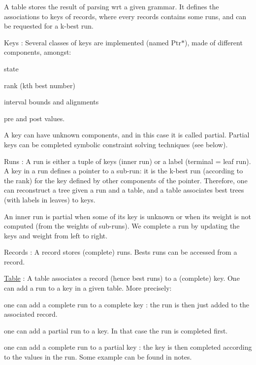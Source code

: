 A table stores the result of parsing wrt a given grammar. It defines the associations to {\ttfamily keys} of {\ttfamily records}, where every {\ttfamily records} contains some {\ttfamily runs}, and can be requested for a k-\/best {\ttfamily run}.

{\ttfamily Keys} \+: Several classes of {\ttfamily keys} are implemented (named {\ttfamily Ptr$\ast$}), made of different components, amongst\+:


\begin{DoxyItemize}
\item state
\item rank (kth best number)
\item interval bounds and alignments
\item pre and post values.
\end{DoxyItemize}

A {\ttfamily key} can have unknown components, and in this case it is called partial. Partial {\ttfamily keys} can be completed symbolic constraint solving techniques (see below).

{\ttfamily Runs} \+: A {\ttfamily run} is either a tuple of {\ttfamily keys} (inner {\ttfamily run}) or a {\ttfamily label} (terminal = leaf {\ttfamily run}). A {\ttfamily key} in a {\ttfamily run} defines a pointer to a sub-\/{\ttfamily run}\+: it is the k-\/best {\ttfamily run} (according to the rank) for the {\ttfamily key} defined by other components of the pointer. Therefore, one can reconstruct a tree given a {\ttfamily run} and a {\ttfamily table}, and a {\ttfamily table} associates best trees (with {\ttfamily labels} in leaves) to {\ttfamily keys}.

An inner {\ttfamily run} is partial when some of its {\ttfamily key} is unknown or when its weight is not computed (from the weights of sub-\/{\ttfamily runs}). We complete a {\ttfamily run} by updating the {\ttfamily keys} and weight from left to right.

{\ttfamily Records} \+: A {\ttfamily record} stores (complete) {\ttfamily runs}. Bests {\ttfamily runs} can be accessed from a record.

{\ttfamily \mbox{\hyperlink{classTable}{Table}}} \+: A {\ttfamily table} associates a {\ttfamily record} (hence best {\ttfamily runs}) to a (complete) {\ttfamily key}. One can add a {\ttfamily run} to a {\ttfamily key} in a given {\ttfamily table}. More precisely\+:


\begin{DoxyItemize}
\item one can add a complete {\ttfamily run} to a complete {\ttfamily key} \+: the {\ttfamily run} is then just added to the associated {\ttfamily record}.
\item one can add a partial {\ttfamily run} to a {\ttfamily key}. In that case the {\ttfamily run} is completed first.
\item one can add a complete {\ttfamily run} to a partial {\ttfamily key} \+: the {\ttfamily key} is then completed according to the values in the {\ttfamily run}. Some example can be found in notes. 
\end{DoxyItemize}